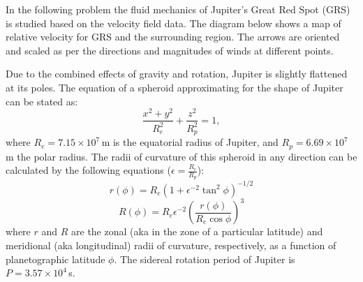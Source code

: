 In the following problem the fluid mechanics of Jupiter's Great Red Spot
(GRS) is studied based on the velocity field data. The diagram below shows a
map of relative velocity for GRS and the surrounding region. The arrows are
oriented and scaled as per the directions and magnitudes of winds at
different points.


Due to the combined effects of gravity and rotation, Jupiter is slightly
flattened at its poles. The equation of a spheroid approximating for the
shape of Jupiter can be stated as:
\[ \frac{x^2 + y^2}{R_e^2} + \frac{z^2}{R_p^2} = 1, \]
where $R_e = 7.15 \times 10^7$\,m is the equatorial radius of Jupiter, and
$R_p = 6.69 \times 10^7$\,m the polar radius. The radii of curvature of this
spheroid in any direction can be calculated by the following equations
($\epsilon = \frac{R_e}{R_p}$):
\[ r(\phi) = R_e \left( 1 + \epsilon^{-2} \tan^2 \phi \right)^{-1/2} \]
\[ R(\phi) = R_e \epsilon^{-2}
   \left( \frac{r(\phi)}{R_e \cos\phi} \right)^{3} \]
where $r$ and $R$ are the zonal (aka in the zone of a particular latitude)
and meridional (aka longitudinal) radii of curvature, respectively, as a
function of planetographic latitude $\phi$. The sidereal rotation period of
Jupiter is $P = 3.57 \times 10^4$\,s.

